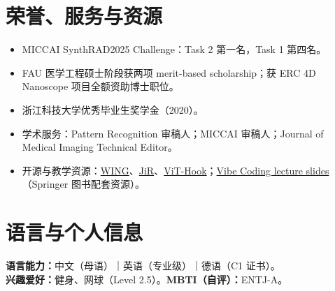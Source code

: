 \documentclass[10pt,a4paper]{article}
\begin{document}
\section{荣誉、服务与资源}
\begin{itemize}
    \item MICCAI SynthRAD2025 Challenge：Task 2 第一名，Task 1 第四名。
    \item FAU 医学工程硕士阶段获两项 merit-based scholarship；获 ERC 4D Nanoscope 项目全额资助博士职位。
    \item 浙江科技大学优秀毕业生奖学金（2020）。
    \item 学术服务：Pattern Recognition 审稿人；MICCAI 审稿人；Journal of Medical Imaging Technical Editor。
    \item 开源与教学资源：\href{https://github.com/siyuan-mei/WING}{WING}、\href{https://github.com/siyuan-mei/JiR}{JiR}、\href{https://github.com/siyuan-mei/ViT-Hook}{ViT-Hook}；\href{https://github.com/PRLab-FAU/VibeCodingSlides}{Vibe Coding lecture slides}（Springer 图书配套资源）。
\end{itemize}

\section{语言与个人信息}
\textbf{语言能力：}中文（母语）｜英语（专业级）｜德语（C1 证书）。\\
\textbf{兴趣爱好：}健身、网球（Level 2.5）。\quad \textbf{MBTI（自评）：}ENTJ-A。
\end{document}
